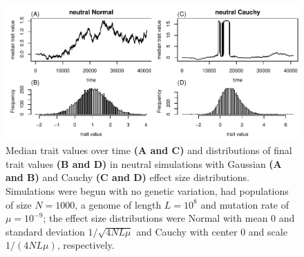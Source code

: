 \documentclass{article}
\theoremstyle{remark}
\theoremstyle{definition}
\begin{document}
\begin{figure}
    \begin{center}
        \includegraphics{sims/neutral_trait_traces}
    \end{center}
    \caption{
        Median trait values over time \textbf{(A and C)}
        and distributions of final trait values \textbf{(B and D)}
        in neutral simulations
        with Gaussian \textbf{(A and B)} and Cauchy \textbf{(C and D)}
        effect size distributions.
        Simulations were begun with no genetic variation,
        had populations of size $N=1000$,
        a genome of length $L=10^8$ and mutation rate of $\mu=10^{-9}$;
        the effect size distributions were
        Normal with mean 0 and standard deviation $1/\sqrt{4NL\mu}$
        and Cauchy with center 0 and scale $1/(4NL\mu)$, respectively.
        \label{fig:trait_distrns}
    }
\end{figure}
\end{document}
